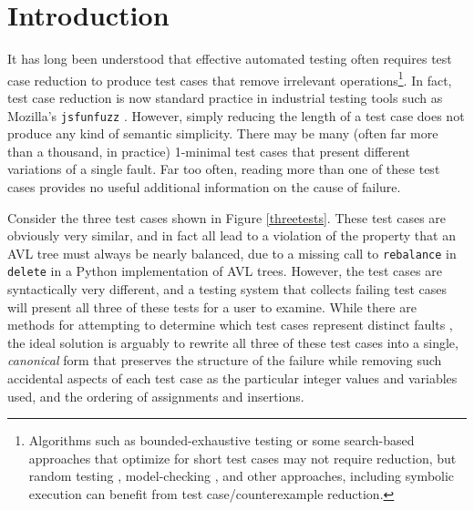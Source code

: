 \section{Introduction}

It has long been understood that effective automated testing often requires
test case reduction \cite{DD,MinUnit,TCminim,ICSEDiff} to produce test cases
that remove irrelevant operations\footnote{Algorithms such as
  bounded-exhaustive testing \cite{SoftBET} or some search-based approaches that
  optimize for short test cases \cite{FA11} may not require reduction, but random
  testing \cite{RandFormal,HamletOnly}, model-checking \cite{Gastin04minimizationof}, and other
  approaches, including symbolic execution \cite{issta14} can benefit from
  test case/counterexample reduction.}.  In fact, test case reduction is
now standard practice in industrial testing tools such as Mozilla's
{\tt jsfunfuzz} \cite{jsfunfuzz,jsfunfuzz2,lithium}.  However, simply reducing the length of a test case
does not produce any kind of semantic simplicity.  There may be many
(often far more than a thousand, in practice) 1-minimal test cases
that present different variations of a single fault.  Far too often,
reading more than one of these test cases provides no useful
additional information on the cause of failure. 

Consider the three test cases shown in Figure \ref{threetests}.  These
test cases are obviously very similar, and in fact all lead to a
violation of the property that an AVL tree must always be nearly
balanced, due to a missing call to {\tt rebalance} in {\tt delete} in
a Python implementation of AVL trees.  However, the test cases are
syntactically very different, and a testing system that collects
failing test cases will present all three of these tests for a user to examine.
While there are methods for attempting to determine which test cases
represent distinct faults \cite{PLDI13}, the ideal solution is
arguably to rewrite all three of these test cases into a single,
\emph{canonical} form that preserves the structure of the failure while removing
such accidental aspects of each test case as the particular integer
values and variables used, and the ordering of assignments and
insertions.

